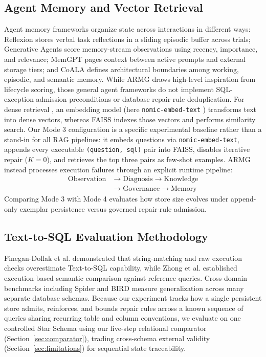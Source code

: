 \subsection{Agent Memory and Vector Retrieval}
Agent memory frameworks organize state across interactions in different ways: Reflexion \cite{shinn2023reflexion} stores verbal task reflections in a sliding episodic buffer across trials; Generative Agents \cite{park2023generativeagents} score memory-stream observations using recency, importance, and relevance; MemGPT \cite{packer2023memgpt} pages context between active prompts and external storage tiers; and CoALA \cite{sumers2024coala} defines architectural boundaries among working, episodic, and semantic memory. While ARMG draws high-level inspiration from lifecycle scoring, those general agent frameworks do not implement SQL-exception admission preconditions or database repair-rule deduplication. For dense retrieval \cite{lewis2020rag}, an embedding model (here \texttt{nomic-\allowbreak{}embed-\allowbreak{}text} \cite{nussbaum2024nomic}) transforms text into dense vectors, whereas FAISS \cite{johnson2021faiss} indexes those vectors and performs similarity search. Our Mode 3 configuration is a specific experimental baseline rather than a stand-in for all RAG pipelines: it embeds questions via \texttt{nomic-\allowbreak{}embed-\allowbreak{}text}, appends every executable \texttt{(question, sql)} pair into FAISS, disables iterative repair ($K=0$), and retrieves the top three pairs as few-shot examples. ARMG instead processes execution failures through an explicit runtime pipeline:
\begin{equation}
\begin{aligned}
\text{Observation} &\to \text{Diagnosis} \to \text{Knowledge} \\
&\to \text{Governance} \to \text{Memory}
\end{aligned}
\end{equation}
Comparing Mode 3 with Mode 4 evaluates how store size evolves under append-only exemplar persistence versus governed repair-rule admission.

\subsection{Text-to-SQL Evaluation Methodology}
Finegan-Dollak et al. \cite{finegandollak2018eval} demonstrated that string-matching and raw execution checks overestimate Text-to-SQL capability, while Zhong et al. \cite{zhong2020distilled} established execution-based semantic comparison against reference queries. Cross-domain benchmarks including Spider \cite{yu2018spider} and BIRD \cite{li2023bird} measure generalization across many separate database schemas. Because our experiment tracks how a single persistent store admits, reinforces, and bounds repair rules across a known sequence of queries sharing recurring table and column conventions, we evaluate on one controlled Star Schema using our five-step relational comparator (Section~\ref{sec:comparator}), trading cross-schema external validity (Section~\ref{sec:limitations}) for sequential state traceability.

